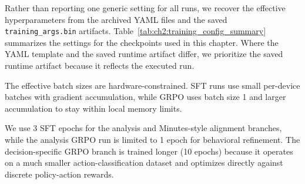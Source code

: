 Rather than reporting one generic setting for all runs, we recover the effective hyperparameters from the archived YAML files and the saved \texttt{training\_args.bin} artifacts. Table~\ref{tab:ch2:training_config_summary} summarizes the settings for the checkpoints used in this chapter. Where the YAML template and the saved runtime artifact differ, we prioritize the saved runtime artifact because it reflects the executed run.

The effective batch sizes are hardware-constrained. SFT runs use small per-device batches with gradient accumulation, while GRPO uses batch size 1 and larger accumulation to stay within local memory limits.

We use 3 SFT epochs for the analysis and Minutes-style alignment branches, while the analysis GRPO run is limited to 1 epoch for behavioral refinement. The decision-specific GRPO branch is trained longer (10 epochs) because it operates on a much smaller action-classification dataset and optimizes directly against discrete policy-action rewards.

